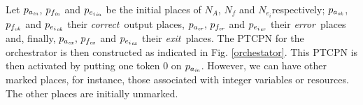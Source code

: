 Let $p_{a_{\it in}}$, $p_{f_{\it in}}$ and $p_{{e_i}_{\it in}}$ be the initial places of
$N_A$, $N_f$ and $N_{e_i}$respectively; $p_{a_{\it ok}}$, $p_{f_{\it ok}}$ and $p_{{e_i}_{\it ok}}$ their {\em correct}\, output places, $p_{a_{\it er}},\, p_{f_{\it
er}}$ and $p_{{e_i}_{\it er}}$ their {\em error}\, places and, finally, $p_{a_{\it ex}},\, p_{f_{\it ex}}$ and $p_{{e_i}_{\it ex}}$ their {\em exit}\, places. The PTCPN for the
orchestrator is then constructed as indicated in Fig. \ref{orchestator}. This PTCPN is then activated by putting one token
$0$ on $p_{a_{\it in}}$. However, we can have other marked places, 
for instance, those associated with integer
variables or resources. 
%
%
%
%
%
%
%
The other places are initially unmarked.

